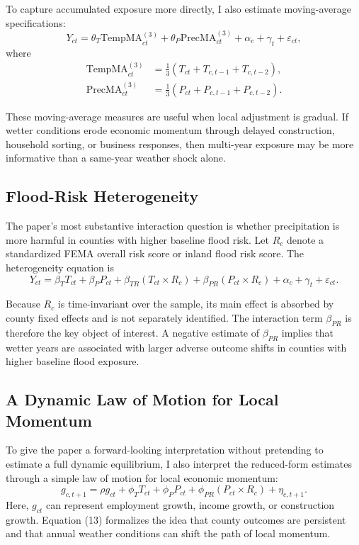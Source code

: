 \documentclass[12pt]{article}
\begin{document}
To capture accumulated exposure more directly, I also estimate moving-average specifications:
\begin{equation}
Y_{ct} = \theta_T \text{TempMA}_{ct}^{(3)} + \theta_P \text{PrecMA}_{ct}^{(3)} + \alpha_c + \gamma_t + \varepsilon_{ct},
\end{equation}
where
\begin{align}
\text{TempMA}_{ct}^{(3)} &= \frac{1}{3}\left(T_{ct}+T_{c,t-1}+T_{c,t-2}\right), \\
\text{PrecMA}_{ct}^{(3)} &= \frac{1}{3}\left(P_{ct}+P_{c,t-1}+P_{c,t-2}\right).
\end{align}

These moving-average measures are useful when local adjustment is gradual. If wetter conditions erode economic momentum through delayed construction, household sorting, or business responses, then multi-year exposure may be more informative than a same-year weather shock alone.

\subsection{Flood-Risk Heterogeneity}

The paper's most substantive interaction question is whether precipitation is more harmful in counties with higher baseline flood risk. Let $R_c$ denote a standardized FEMA overall risk score or inland flood risk score. The heterogeneity equation is
\begin{equation}
Y_{ct} = \beta_T T_{ct} + \beta_P P_{ct} + \beta_{TR}\left(T_{ct}\times R_c\right) + \beta_{PR}\left(P_{ct}\times R_c\right) + \alpha_c + \gamma_t + \varepsilon_{ct}.
\end{equation}

Because $R_c$ is time-invariant over the sample, its main effect is absorbed by county fixed effects and is not separately identified. The interaction term $\beta_{PR}$ is therefore the key object of interest. A negative estimate of $\beta_{PR}$ implies that wetter years are associated with larger adverse outcome shifts in counties with higher baseline flood exposure.

\subsection{A Dynamic Law of Motion for Local Momentum}

To give the paper a forward-looking interpretation without pretending to estimate a full dynamic equilibrium, I also interpret the reduced-form estimates through a simple law of motion for local economic momentum:
\begin{equation}
g_{c,t+1} = \rho g_{ct} + \phi_T T_{ct} + \phi_P P_{ct} + \phi_{PR}\left(P_{ct}\times R_c\right) + \eta_{c,t+1}.
\end{equation}
Here, $g_{ct}$ can represent employment growth, income growth, or construction growth. Equation (13) formalizes the idea that county outcomes are persistent and that annual weather conditions can shift the path of local momentum.
\end{document}
